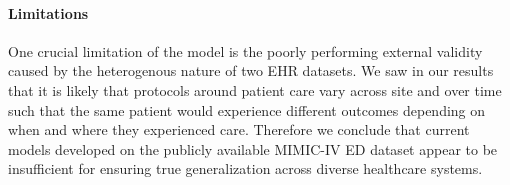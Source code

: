 \documentclass[pmlr]{jmlr}%
\begin{document}
{%





\paragraph{Limitations}

One crucial limitation of the model is the poorly performing external validity caused by the heterogenous nature of two EHR datasets. 
We saw in our results that it is likely that protocols around patient care vary across site and over time such that the same patient would experience different outcomes depending on when and where they experienced care. Therefore we conclude that current models developed on the publicly available MIMIC-IV ED dataset appear to be insufficient for ensuring true generalization across diverse healthcare systems.

}
\end{document}
